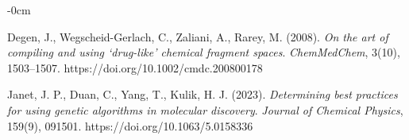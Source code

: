 \documentclass[life,article,submit,pdftex,moreauthors]{Definitions/mdpi}
\begin{document}
\begin{adjustwidth}{-\extralength}{0cm}
{\begin{thebibliography}{999}
Degen, J., Wegscheid-Gerlach, C., Zaliani, A., Rarey, M. (2008).
\textit{On the art of compiling and using ‘drug-like’ chemical fragment spaces}.
\textit{ChemMedChem}, 3(10), 1503–1507. https://doi.org/10.1002/cmdc.200800178

Janet, J. P., Duan, C., Yang, T., Kulik, H. J. (2023).
\textit{Determining best practices for using genetic algorithms in molecular discovery}.
\textit{Journal of Chemical Physics}, 159(9), 091501. https://doi.org/10.1063/5.0158336


\end{thebibliography}
}



%


\PublishersNote{}
\end{adjustwidth}
\end{document}
